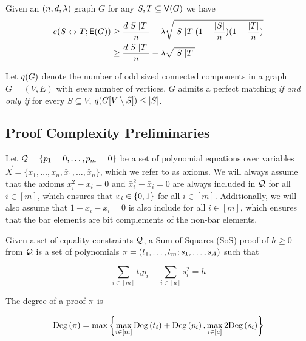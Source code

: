 \documentclass[11pt]{article}
\begin{document}
\begin{lemma}\label{lemma:expanders-mixing-lemma}
  Given an $(n, d, \lambda)$ graph $G$ for any $S, T \subseteq \mathsf{V}(G)$ we have
\begin{align*}
  e(S \leftrightarrow T; \mathsf{E}(G)) &\geq \frac{d|S||T|}{n} - \lambda\sqrt{|S||T| (1 - \frac{|S|}{n}) (1 - \frac{|T|}{n})   }	\\
  &\geq \frac{d|S||T|}{n} - \lambda\sqrt{|S||T| }
\end{align*}
  
\end{lemma}

\begin{lemma}\label{lemma:tutte-criterion}
Let $q(G)$ denote the number of odd sized connected components in a graph $G=(V,E)$ with \emph{even} number of vertices.
$G$ admits a perfect matching \emph{if and only if} for every $S \subseteq V$, $q(G[V \setminus S]) \leq |S|$.
\end{lemma}


\subsection{Proof Complexity Preliminaries}
\label{sec:proof-system-prelims}

Let $\mathcal{Q} = \{ p_1 = 0, \dots, p_m = 0\}$ be a set of polynomial equations over variables $\vec{X} = \{x_1, \dots, x_n, \bar{x}_1, \dots, \bar{x}_n\}$, which we refer to as axioms.
We will always assume that the axioms $x_i^2 - x_i = 0$ and $\bar{x}_i^2 - \bar{x}_i = 0$ are always included in $\mathcal{Q}$ for all $i \in [m]$, which ensures that $x_i \in \{0,1\}$ for all $i\in [m]$.
Additionally, we will also assume that $1 - x_i - \bar{x}_i=0$ is also include for all $i \in [m]$, which ensures that the bar elements are bit complements of the non-bar elements.

\begin{definition}\label{def:sum-of-squares} Given a set of equality constraints $\mathcal{Q}$, a Sum of Squares (SoS) proof of $h \geq 0$ from $\mathcal{Q}$ is a set of polynomials $\pi = (t_1, \dots, t_m; s_1, \dots, s_A)$ such that 

\[ \sum_{i \in [m]} t_ip_i+ \sum_{i \in [a]} s_i^2 = h\]

The degree of a proof $\pi$ is 

\[ \text{Deg}\left(\pi\right) = \max\left\{\max_{i \in [m]} \text{Deg}\left(t_i\right) + \text{Deg}\left(p_i\right), \max_{i \in [a]} 2\text{Deg}\left(s_i\right)\right\}\]	


\end{definition}
\end{document}
